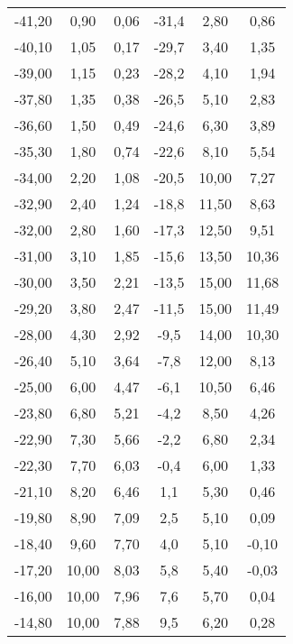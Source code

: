 \begin{table}[htp]
\begin{center}
\begin{tabular}{cccccc}
			-41,20 & 0,90 & 0,06 & -31,4 & 2,80 & 0,86\\
			-40,10 & 1,05 & 0,17 & -29,7 & 3,40 & 1,35\\
			-39,00 & 1,15 & 0,23 & -28,2 & 4,10 & 1,94\\
			-37,80 & 1,35 & 0,38 & -26,5 & 5,10 & 2,83\\
			-36,60 & 1,50 & 0,49 & -24,6 & 6,30 & 3,89\\
			-35,30 & 1,80 & 0,74 & -22,6 & 8,10 & 5,54\\
			-34,00 & 2,20 & 1,08 & -20,5 & 10,00 & 7,27\\
			-32,90 & 2,40 & 1,24 & -18,8 & 11,50 & 8,63\\
			-32,00 & 2,80 & 1,60 & -17,3 & 12,50 & 9,51\\
			-31,00 & 3,10 & 1,85 & -15,6 & 13,50 & 10,36\\
			-30,00 & 3,50 & 2,21 & -13,5 & 15,00 & 11,68\\
			-29,20 & 3,80 & 2,47 & -11,5 & 15,00 & 11,49\\
			-28,00 & 4,30 & 2,92 & -9,5 & 14,00 & 10,30\\
			-26,40 & 5,10 & 3,64 & -7,8 & 12,00 & 8,13\\
			-25,00 & 6,00 & 4,47 & -6,1 & 10,50 & 6,46\\
			-23,80 & 6,80 & 5,21 & -4,2 & 8,50 & 4,26\\
			-22,90 & 7,30 & 5,66 & -2,2 & 6,80 & 2,34\\
			-22,30 & 7,70 & 6,03 & -0,4 & 6,00 & 1,33\\
			-21,10 & 8,20 & 6,46 & 1,1 & 5,30 & 0,46\\
			-19,80 & 8,90 & 7,09 & 2,5 & 5,10 & 0,09\\
			-18,40 & 9,60 & 7,70 & 4,0 & 5,10 & -0,10\\
			-17,20 & 10,00 & 8,03 & 5,8 & 5,40 & -0,03\\
			-16,00 & 10,00 & 7,96 & 7,6 & 5,70 & 0,04\\
			-14,80 & 10,00 & 7,88 & 9,5 & 6,20 & 0,28\\
      \bottomrule
      \end{tabular}
    \end{center}
  \end{table}
